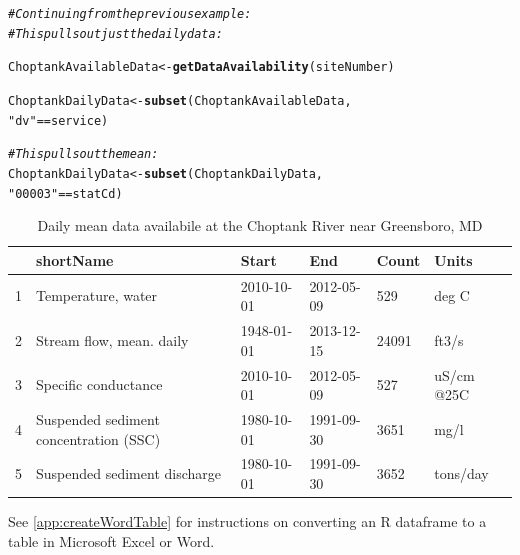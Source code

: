 \documentclass[a4paper,11pt]{article}\usepackage[]{graphicx}\usepackage[]{color}
\makeatletter
\newcommand{\hlstr}[1]{\textcolor[rgb]{0.192,0.494,0.8}{#1}}%
\newcommand{\hlcom}[1]{\textcolor[rgb]{0.678,0.584,0.686}{\textit{#1}}}%
\newcommand{\hlopt}[1]{\textcolor[rgb]{0,0,0}{#1}}%
\newcommand{\hlstd}[1]{\textcolor[rgb]{0.345,0.345,0.345}{#1}}%
\newcommand{\hlkwb}[1]{\textcolor[rgb]{0.69,0.353,0.396}{#1}}%
\newcommand{\hlkwd}[1]{\textcolor[rgb]{0.737,0.353,0.396}{\textbf{#1}}}%
\newenvironment{kframe}{%
 \def\at@end@of@kframe{}%
 \ifinner\ifhmode%
  \def\at@end@of@kframe{\end{minipage}}%
  \begin{minipage}{\columnwidth}%
 \fi\fi%
 \def\FrameCommand##1{\hskip\@totalleftmargin \hskip-\fboxsep
 \colorbox{shadecolor}{##1}\hskip-\fboxsep
     \hskip-\linewidth \hskip-\@totalleftmargin \hskip\columnwidth}%
 \MakeFramed {\advance\hsize-\width
   \@totalleftmargin\z@ \linewidth\hsize
   \@setminipage}}%
 {\par\unskip\endMakeFramed%
 \at@end@of@kframe}
\newenvironment{knitrout}{}{} %
\makeatother
\begin{document}
\begin{knitrout}
\color{fgcolor}\begin{kframe}
\begin{alltt}
\hlcom{# Continuing from the previous example:}
\hlcom{# This pulls out just the daily data:}

\hlstd{ChoptankAvailableData} \hlkwb{<-} \hlkwd{getDataAvailability}\hlstd{(siteNumber)}

\hlstd{ChoptankDailyData} \hlkwb{<-} \hlkwd{subset}\hlstd{(ChoptankAvailableData,}
                            \hlstr{"dv"} \hlopt{==} \hlstd{service)}

\hlcom{# This pulls out the mean:}
\hlstd{ChoptankDailyData} \hlkwb{<-} \hlkwd{subset}\hlstd{(ChoptankDailyData,}
                            \hlstr{"00003"} \hlopt{==} \hlstd{statCd)}
\end{alltt}
\end{kframe}
\end{knitrout}


\begin{table}[ht]
\centering
\begin{tabular}{rlllll}
  \hline
 & shortName & Start & End & Count & Units \\ 
  \hline
1 & Temperature, water & 2010-10-01 & 2012-05-09 & 529 & deg C \\ 
  2 & Stream flow, mean. daily & 1948-01-01 & 2013-12-15 & 24091 & ft3/s \\ 
  3 & Specific conductance & 2010-10-01 & 2012-05-09 & 527 & uS/cm @25C \\ 
  4 & Suspended sediment concentration (SSC) & 1980-10-01 & 1991-09-30 & 3651 & mg/l \\ 
  5 & Suspended sediment discharge & 1980-10-01 & 1991-09-30 & 3652 & tons/day \\ 
   \hline
\end{tabular}
\caption{Daily mean data availabile at the Choptank River near Greensboro, MD} 
\label{tab:gda}
\end{table}



See \ref{app:createWordTable} for instructions on converting an R dataframe to a table in Microsoft Excel or Word.

\FloatBarrier

\end{document}
